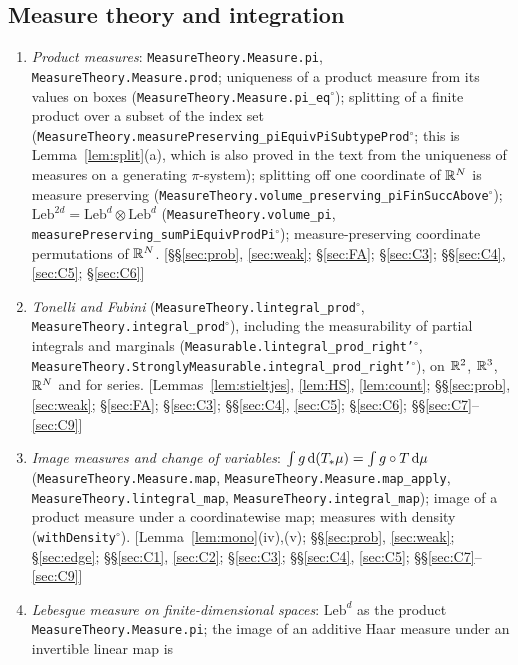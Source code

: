 \subsection{Measure theory and integration}
\begin{enumerate}[leftmargin=2em,itemsep=1pt]\raggedright
\item \emph{Product measures}: \texttt{MeasureTheory.Measure.pi}, \texttt{MeasureTheory.Measure.prod}; uniqueness of a product measure from its values on boxes (\texttt{MeasureTheory.Measure.pi\_eq}$^\circ$);
splitting of a finite product over a subset of the index set (\texttt{MeasureTheory.measurePreserving\_piEquivPiSubtypeProd}$^\circ$; this is Lemma~\ref{lem:split}(a), which is also proved in the text
from the uniqueness of measures on a generating $\pi$-system); splitting off one coordinate of $\mathbb{R}^N$ is measure preserving (\texttt{MeasureTheory.volume\_preserving\_piFinSuccAbove}$^\circ$);
$\mathrm{Leb}^{2d}=\mathrm{Leb}^d\otimes\mathrm{Leb}^d$ (\texttt{MeasureTheory.volume\_pi}, \texttt{measurePreserving\_sumPiEquivProdPi}$^\circ$); measure-preserving coordinate permutations of $\mathbb{R}^N$.
\hfill[\S\S\ref{sec:prob}, \ref{sec:weak}; \S\ref{sec:FA}; \S\ref{sec:C3}; \S\S\ref{sec:C4}, \ref{sec:C5}; \S\ref{sec:C6}]
\item \emph{Tonelli and Fubini} (\texttt{MeasureTheory.lintegral\_prod}$^\circ$, \texttt{MeasureTheory.integral\_prod}$^\circ$), including the measurability of partial integrals and marginals
(\texttt{Measurable.lintegral\_prod\_right'}$^\circ$, \texttt{MeasureTheory.StronglyMeasurable.integral\_prod\_right'}$^\circ$), on $\mathbb{R}^2$, $\mathbb{R}^3$, $\mathbb{R}^N$ and for series.
\hfill[Lemmas~\ref{lem:stieltjes}, \ref{lem:HS}, \ref{lem:count}; \S\S\ref{sec:prob}, \ref{sec:weak}; \S\ref{sec:FA}; \S\ref{sec:C3}; \S\S\ref{sec:C4}, \ref{sec:C5}; \S\ref{sec:C6}; \S\S\ref{sec:C7}--\ref{sec:C9}]
\item \emph{Image measures and change of variables}: $\int g\,\mathrm{d}(T_*\mu)=\int g\circ T\,\mathrm{d}\mu$ (\texttt{MeasureTheory.Measure.map}, \texttt{MeasureTheory.Measure.map\_apply}, \texttt{MeasureTheory.lintegral\_map},
\texttt{MeasureTheory.integral\_map}); image of a product measure under a coordinatewise map; measures with density (\texttt{withDensity}$^\circ$).
\hfill[Lemma~\ref{lem:mono}(iv),(v); \S\S\ref{sec:prob}, \ref{sec:weak}; \S\ref{sec:edge}; \S\S\ref{sec:C1}, \ref{sec:C2}; \S\ref{sec:C3}; \S\S\ref{sec:C4}, \ref{sec:C5}; \S\S\ref{sec:C7}--\ref{sec:C9}]
\item \emph{Lebesgue measure on finite-dimensional spaces}: $\mathrm{Leb}^d$ as the product \texttt{MeasureTheory.Measure.pi}; the image of an additive Haar measure under an invertible linear map is

\end{enumerate}
